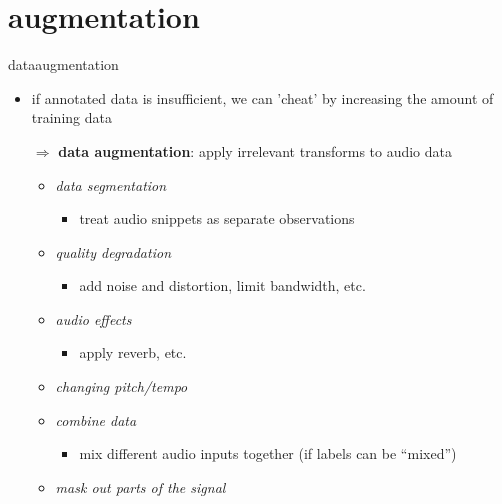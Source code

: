     \section{augmentation}
        \begin{frame}{data}{augmentation}
            \vspace{-3mm}
            \begin{itemize}
                \item   if annotated data is insufficient, we can 'cheat' by increasing the amount of training data
                \bigskip
                \item[$\Rightarrow$] \textbf{data augmentation}: apply irrelevant transforms to audio data
                    \begin{itemize}
                        \item<2->   \textit{data segmentation}
                            \begin{itemize}
                                \item   treat audio snippets as separate observations
                            \end{itemize}
                        \item<3->   \textit{quality degradation}
                            \begin{itemize}
                                \item   add noise and distortion, limit bandwidth, etc.
                            \end{itemize}
                        \item<4->   \textit{audio effects}
                            \begin{itemize}
                                \item   apply reverb, etc.
                            \end{itemize}
                        \item<5->   \textit{changing pitch/tempo}
                        \item<6->   \textit{combine data}
                            \begin{itemize}
                                \item   mix different audio inputs together (if labels can be ``mixed'')
                            \end{itemize}
                        \item<7->   \textit{mask out parts of the signal}
                    \end{itemize}
            \end{itemize}
        \end{frame}

